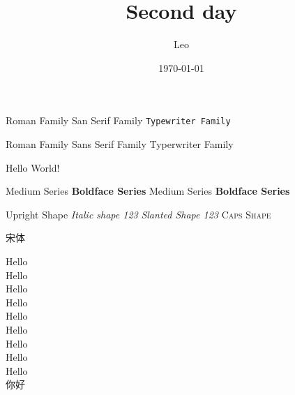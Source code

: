 \documentclass{article}[12pt]
\title{Second day}
\author{Leo}
\date{\today}
\begin{document}
\maketitle

\textrm{Roman Family} \textsf{San Serif Family} \texttt{Typewriter Family}


{\rmfamily Roman Family} {\sffamily Sans Serif Family} {\ttfamily Typerwriter Family}

\sffamily Hello World!

\textmd{Medium Series} \textbf{Boldface Series}
{\mdseries Medium Series} {\bfseries Boldface Series}

\textup{Upright Shape} \textit{Italic shape 123}
{\slshape Slanted Shape 123} {\scshape Caps Shape}

{\songti 宋体}  

{\tiny Hello} \\
{\scriptsize Hello} \\
{\footnotesize Hello} \\
{\small Hello} \\
{\normalsize Hello} \\
{\large Hello} \\
{\LARGE Hello} \\
{\huge Hello} \\
{\Huge Hello} \\
{你好}
\end{document}
